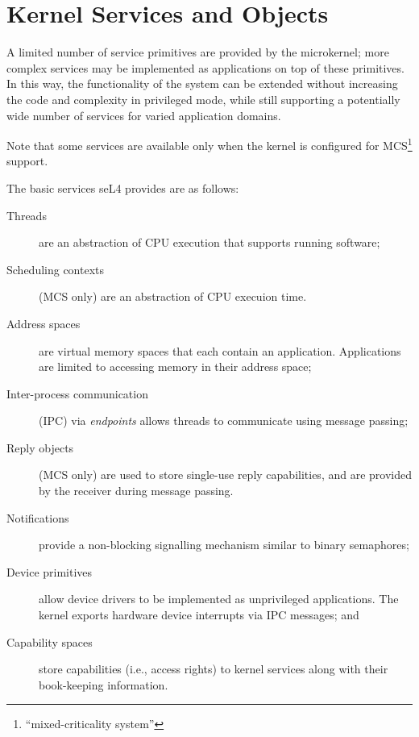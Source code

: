 %
%
%

\chapter{\label{ch:objects}Kernel Services and Objects}

A limited number of service primitives are provided by the microkernel;
more complex services may be implemented as applications on top of these
primitives. In this way, the functionality of the system can be extended
without increasing the code and complexity in privileged mode, while
still supporting a potentially wide number of services for varied
application domains.

Note that some services are available only when the kernel is configured for
MCS\footnote{``mixed-criticality system''} support.

The basic services seL4 provides are as follows:
\begin{description}
    \item[Threads] are an abstraction of CPU execution that supports
    running software;

    \item[Scheduling contexts] (MCS only) are an abstraction of CPU execuion time.

    \item[Address spaces] are virtual memory spaces that each contain an
    application. Applications are limited to accessing memory in their
    address space;

    \item[Inter-process communication] (IPC) via \emph{endpoints} allows
    threads to communicate using message passing;

    \item[Reply objects] (MCS only) are used to store single-use reply capabilities,
    and are provided by the receiver during message passing.

    \item[Notifications] provide a non-blocking signalling mechanism
      similar to binary semaphores;

    \item[Device primitives] allow device drivers to be implemented as
    unprivileged applications.  The kernel exports hardware device
    interrupts via IPC messages; and

    \item[Capability spaces] store capabilities (i.e., access rights) to
    kernel services along with their book-keeping information.
\end{description}

